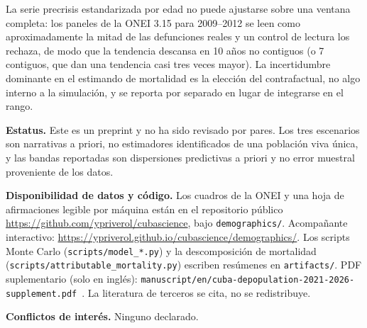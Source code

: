 \documentclass[11pt,a4paper]{article}
\begin{document}
La serie precrisis estandarizada por edad no puede ajustarse sobre una ventana completa: los paneles de la ONEI 3.15 para 2009--2012 se leen como aproximadamente la mitad de las defunciones reales y un control de lectura los rechaza, de modo que la tendencia descansa en 10 años no contiguos (o 7 contiguos, que dan una tendencia casi tres veces mayor).
La incertidumbre dominante en el estimando de mortalidad es la elección del contrafactual, no algo interno a la simulación, y se reporta por separado en lugar de integrarse en el rango.

\textbf{Estatus.}
Este es un preprint y no ha sido revisado por pares.
Los tres escenarios son narrativas a priori, no estimadores identificados de una población viva única, y las bandas reportadas son dispersiones predictivas a priori y no error muestral proveniente de los datos.

\textbf{Disponibilidad de datos y código.}
Los cuadros de la ONEI y una hoja de afirmaciones legible por máquina están en el repositorio público
\url{https://github.com/ypriverol/cubascience}, bajo \texttt{demographics/}.
Acompañante interactivo: \url{https://ypriverol.github.io/cubascience/demographics/}.
Los scripts Monte Carlo (\texttt{scripts/model\_*.py}) y la descomposición de mortalidad
(\texttt{scripts/attributable\_mortality.py}) escriben resúmenes en \texttt{artifacts/}.
PDF suplementario (solo en inglés): \texttt{manuscript/en/cuba-depopulation-2021-2026-supplement.pdf}~\citep{modele_supp}.
La literatura de terceros se cita, no se redistribuye.

\textbf{Conflictos de interés.}
Ninguno declarado.

\FloatBarrier


\end{document}

